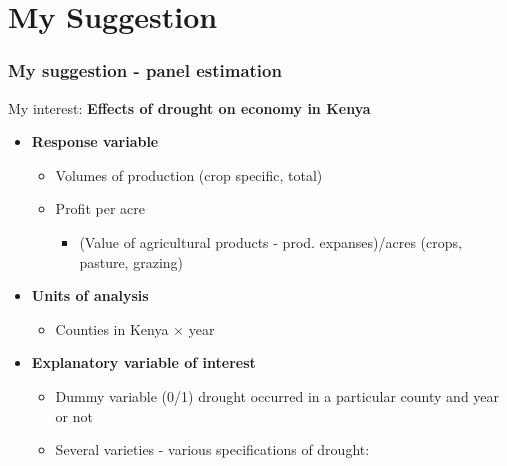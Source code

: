 \documentclass{beamer}              %
\begin{document}
\section{My Suggestion}


\begin{frame}

\frametitle{My suggestion - panel estimation}\label{MySuggestion1} 

My interest: \textbf{Effects of drought on economy in Kenya}
\begin{itemize}

\item \textbf{Response variable}

\begin{itemize}
\item Volumes of production (crop specific, total)
\item Profit per acre \normalsize{\citep{Deschenes2007Ric}}

\begin{itemize}
\item \footnotesize{(Value of agricultural products - prod. expanses)/acres (crops, pasture, grazing)}\\ 
\end{itemize}
\end{itemize}
\item \textbf{Units of analysis}
\begin{itemize}
\item Counties in Kenya $\times$ year
\
\end{itemize}


\item \textbf{Explanatory variable of interest}

\begin{itemize}
\item Dummy variable (0/1) drought occurred in a particular county and year or not
\item Several varieties - various specifications of drought:

\end{itemize}


\end{itemize}

\end{frame}






\end{document}
